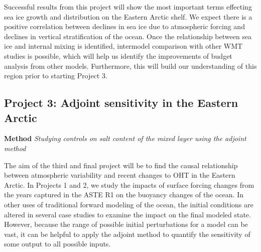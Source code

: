 \documentclass[a4paper,12pt]{article}
\begin{document}
    Successful results from this project will show the most important terms effecting sea ice growth and distribution on the Eastern Arctic shelf. We expect there is a positive correlation between declines in sea ice due to atmospheric forcing and declines in vertical stratification of the ocean. Once the relationship between sea ice and internal mixing is identified, intermodel comparison with other WMT studies is possible, which will help us identify the improvements of budget analysis from other models. Furthermore, this will build our understanding of this region prior to starting Project 3.


    \subsection{Project 3: Adjoint sensitivity in the Eastern Arctic}

    \begin{tcolorbox}[minipage,colback=mossgreen,arc=10pt,outer arc=10pt]
    \centering
    \textbf{Method} \emph{Studying controls on salt content of the mixed layer using the adjoint method}
    \end{tcolorbox}\label{sec3_1}



    The aim of the third and final project will be to find the causal relationship between atmospheric variability and recent changes to OHT in the Eastern Arctic. In Projects 1 and 2, we study the impacts of surface forcing changes from the years captured in the ASTE R1 on the buoyancy changes of the ocean. In other uses of traditional forward modeling of the ocean, the initial conditions are altered in several case studies to examine the impact on the final modeled state. However, because the range of possible initial perturbations for a model can be vast, it can be helpful to apply the adjoint method to quantify the sensitivity of some output to all possible inputs.
    
\end{document}
